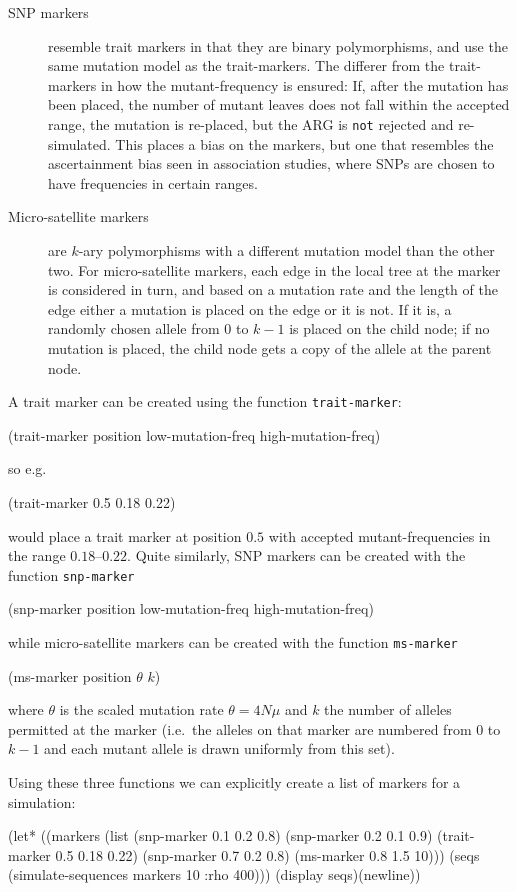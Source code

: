\documentclass{manual}
\begin{document}
\begin{empfile}
\begin{description}
\item[SNP markers] resemble trait markers in that they are binary
  polymorphisms, and use the same mutation model as the trait-markers.
  The differer from the trait-markers in how the mutant-frequency is
  ensured: If, after the mutation has been placed, the number of
  mutant leaves does not fall within the accepted range, the mutation
  is re-placed, but the ARG is \texttt{not} rejected and
  re-simulated.  This places a bias on the markers, but one that
  resembles the ascertainment bias seen in association studies, where
  SNPs are chosen to have frequencies in certain ranges.
  
\item[Micro-satellite markers] are $k$-ary polymorphisms with a
  different mutation model than the other two.  For micro-satellite
  markers, each edge in the local tree at the marker is considered in
  turn, and based on a mutation rate and the length of the edge either
  a mutation is placed on the edge or it is not.  If it is, a randomly
  chosen allele from $0$ to $k-1$ is placed on the child node; if no
  mutation is placed, the child node gets a copy of the allele at the
  parent node.
\end{description}

A trait marker can be created using the function
\texttt{trait-marker}:
\begin{code}
(trait-marker position low-mutation-freq high-mutation-freq)
\end{code}
so e.g.\
\begin{code}
(trait-marker 0.5 0.18 0.22)
\end{code}
would place a trait marker at position $0.5$ with accepted
mutant-frequencies in the range $0.18$--$0.22$.  Quite similarly, SNP
markers can be created with the function \texttt{snp-marker}
\begin{code}
(snp-marker position low-mutation-freq high-mutation-freq)
\end{code}
while micro-satellite markers can be created with the function
\texttt{ms-marker}
\begin{code}
(ms-marker position \(\theta\) \(k\))
\end{code}
where $\theta$ is the scaled mutation rate $\theta=4N\mu$ and $k$ the
number of alleles permitted at the marker (i.e.\ the alleles on that
marker are numbered from $0$ to $k-1$ and each mutant allele is drawn
uniformly from this set).

Using these three functions we can explicitly create a list of markers
for a simulation:
\begin{code}
(let* ((markers (list (snp-marker   0.1  0.2  0.8)
                      (snp-marker   0.2  0.1  0.9)
                      (trait-marker 0.5  0.18 0.22)
                      (snp-marker   0.7  0.2  0.8)
                      (ms-marker    0.8  1.5  10)))
       (seqs (simulate-sequences markers 10 :rho 400)))
  (display seqs)(newline))
\end{code}


\end{empfile}
\end{document}
